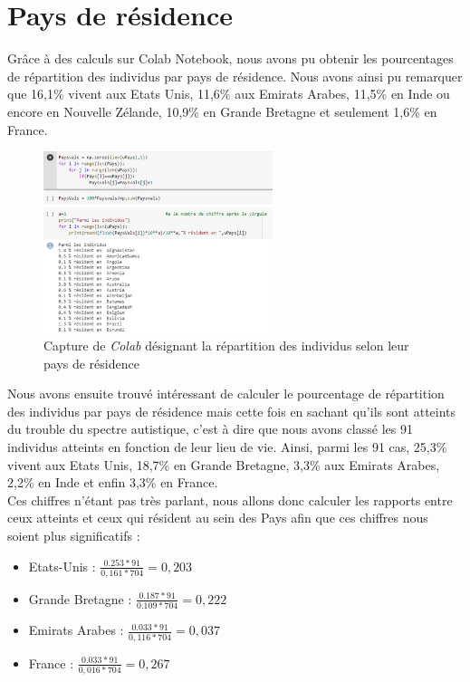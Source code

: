 \documentclass[12,french]{report}
\begin{document}
\section{Pays de résidence}
Grâce à des calculs sur Colab Notebook, nous avons pu obtenir les pourcentages de répartition des individus par pays de résidence. Nous avons ainsi pu remarquer que 16,1\% vivent aux Etats Unis, 11,6\% aux Emirats Arabes, 11,5\% en Inde ou encore en Nouvelle Zélande, 10,9\% en Grande Bretagne et seulement 1,6\% en France.\\

\begin{figure}[H]
	\center
	\includegraphics[width=0.6\textwidth]{./Images/11}
	\caption{Capture de \textit{Colab} désignant la répartition des individus selon leur pays de résidence}
\end{figure}\vspace{0.1cm}

	Nous avons ensuite trouvé intéressant de calculer le pourcentage de répartition des individus par pays de résidence mais cette fois en sachant qu’ils sont atteints du trouble du spectre autistique, c’est à dire que nous avons classé les 91 individus atteints en fonction de leur lieu de vie. Ainsi, parmi les 91 cas, 25,3\% vivent aux Etats Unis, 18,7\% en Grande Bretagne, 3,3\% aux Emirats Arabes, 2,2\% en Inde et enfin 3,3\% en France.\\
	
	Ces chiffres n’étant pas très parlant, nous allons donc calculer les rapports entre ceux atteints et ceux qui résident au sein des Pays afin que ces chiffres nous soient plus significatifs :

\begin{itemize}
	\item Etats-Unis : $\frac{0.253*91}{0,161*704}=0,203$
	\item Grande Bretagne : $\frac{0.187*91}{0.109*704}=0,222$
	\item Emirats Arabes : $\frac{0.033*91}{0,116*704}=0,037$
	\item France : $\frac{0.033*91}{0,016*704}=0,267$
\end{itemize}\vspace{0.3cm}
\end{document}
